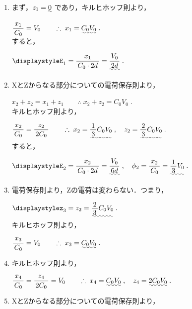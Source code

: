 \documentclass[../../../uem_phy_std_a.tex]{subfiles}
\begin{document}
    \begin{enumerate}
        \item まず，$z_1 = \uwave{0}$ であり，キルヒホッフ則より，
            
            \myspaceb%
            $\displaystyle%
                \myfracc{x_1}{C_0} = V_0%
                \qquad \therefore \; x_1 = \uwave{C_0 V_0} \;.
            $\\            
            すると，
            
            \myspaceb%
            $\displaystyle%
                E_1 = \myfracc{x_1}{C_0 \cdot 2d} = \uwave{\myfracc{V_0}{2d}} \;.
            $
        \item XとZからなる部分についての電荷保存則より，
            
            \myspaceb%
            $\displaystyle%
                x_2 + z_2 = x_1 + z_1%
                \qquad \therefore \; x_2 + z_2 = C_0 V_0 \;.
            $\\
            キルヒホッフ則より，
            
            \myspaceb%
            $\displaystyle%
                \myfracc{x_2}{C_0} = \myfracc{z_2}{2C_0} %
                \qquad \therefore \; x_2 = \uwave{\myfraca{1}{3} C_0 V_0} \;,%
                \quad z_2 = \uwave{\myfraca{2}{3} C_0 V_0} \;.
            $\\
            すると，
            
            \myspaceb%
            $\displaystyle%
                E_2 = \myfracc{x_2}{C_0 \cdot 2d} = \uwave{\myfracc{V_0}{6d}} \;,%
                \quad \phi_2 = \myfracc{x_2}{C_0} = \uwave{\myfraca{1}{3} V_0} \;.
            $
        \item 電荷保存則より，Zの電荷は変わらない．つまり，
            
            \myspaceb%
            $\displaystyle%
                z_3 = z_2 = \uwave{\myfraca{2}{3} C_0 V_0} \;.
            $\\
            キルヒホッフ則より，
            
            \myspaceb%
            $\displaystyle%
                \myfracc{x_3}{C_0} = V_0%
                \qquad \therefore \; x_3 = \uwave{C_0 V_0} \;.
            $
        \item キルヒホッフ則より，
            
            \myspaceb%
            $\displaystyle%
                \myfracc{x_4}{C_0} = \myfracc{z_4}{2C_0} = V_0%
                \qquad \therefore \; x_4 = \uwave{C_0 V_0} \;,%
                \quad z_4 = \uwave{2C_0 V_0} \;.
            $
        \item XとZからなる部分についての電荷保存則より，
            

\end{enumerate}
\end{document}
